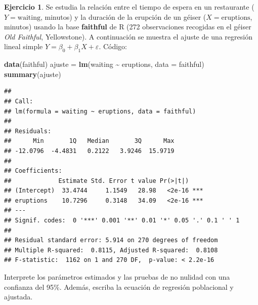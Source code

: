 \documentclass[
  11pt,
]{book}
\newenvironment{Shaded}{\begin{snugshade}}{\end{snugshade}}
\newcommand{\AttributeTok}[1]{\textcolor[rgb]{0.13,0.29,0.53}{#1}}
\newcommand{\FunctionTok}[1]{\textcolor[rgb]{0.13,0.29,0.53}{\textbf{#1}}}
\newcommand{\NormalTok}[1]{#1}
\newcommand{\OtherTok}[1]{\textcolor[rgb]{0.56,0.35,0.01}{#1}}
\newcommand{\SpecialCharTok}[1]{\textcolor[rgb]{0.81,0.36,0.00}{\textbf{#1}}}
\theoremstyle{definition}
\theoremstyle{definition}
\theoremstyle{definition}
\newtheorem{exercise}{Ejercicio}[chapter]
\theoremstyle{definition}
\theoremstyle{remark}
\begin{document}
\begin{exercise}
Se estudia la relación entre el tiempo de espera en un restaurante (\(Y=\text{waiting}\), minutos) y la duración de la erupción de un géiser (\(X=\text{eruptions}\), minutos) usando la base \textbf{faithful} de R (272 observaciones recogidas en el géiser \emph{Old Faithful}, Yellowstone). A continuación se muestra el ajuste de una regresión lineal simple \(Y=\beta_0+\beta_1 X+\varepsilon\). Código:

\begin{Shaded}
\begin{Highlighting}[]
\FunctionTok{data}\NormalTok{(faithful)}
\NormalTok{ajuste }\OtherTok{=} \FunctionTok{lm}\NormalTok{(waiting }\SpecialCharTok{\textasciitilde{}}\NormalTok{ eruptions, }\AttributeTok{data =}\NormalTok{ faithful)}
\FunctionTok{summary}\NormalTok{(ajuste)}
\end{Highlighting}
\end{Shaded}

\begin{verbatim}
## 
## Call:
## lm(formula = waiting ~ eruptions, data = faithful)
## 
## Residuals:
##      Min       1Q   Median       3Q      Max 
## -12.0796  -4.4831   0.2122   3.9246  15.9719 
## 
## Coefficients:
##             Estimate Std. Error t value Pr(>|t|)    
## (Intercept)  33.4744     1.1549   28.98   <2e-16 ***
## eruptions    10.7296     0.3148   34.09   <2e-16 ***
## ---
## Signif. codes:  0 '***' 0.001 '**' 0.01 '*' 0.05 '.' 0.1 ' ' 1
## 
## Residual standard error: 5.914 on 270 degrees of freedom
## Multiple R-squared:  0.8115, Adjusted R-squared:  0.8108 
## F-statistic:  1162 on 1 and 270 DF,  p-value: < 2.2e-16
\end{verbatim}

Interprete los parámetros estimados y las pruebas de no nulidad con una confianza del 95\%. Además, escriba la ecuación de regresión poblacional y ajustada.
\end{exercise}
\end{document}
